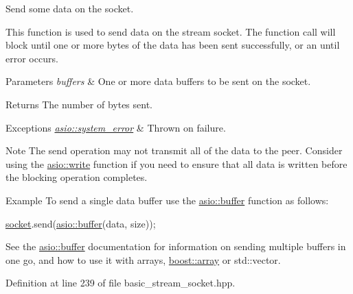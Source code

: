 Send some data on the socket. 

This function is used to send data on the stream socket. The function call will block until one or more bytes of the data has been sent successfully, or an until error occurs.


\begin{DoxyParams}{Parameters}
{\em buffers} & One or more data buffers to be sent on the socket.\\
\hline
\end{DoxyParams}
\begin{DoxyReturn}{Returns}
The number of bytes sent.
\end{DoxyReturn}

\begin{DoxyExceptions}{Exceptions}
{\em \hyperlink{classasio_1_1system__error}{asio\+::system\+\_\+error}} & Thrown on failure.\\
\hline
\end{DoxyExceptions}
\begin{DoxyNote}{Note}
The send operation may not transmit all of the data to the peer. Consider using the \hyperlink{group__write}{asio\+::write} function if you need to ensure that all data is written before the blocking operation completes.
\end{DoxyNote}
\begin{DoxyParagraph}{Example}
To send a single data buffer use the \hyperlink{group__buffer}{asio\+::buffer} function as follows\+: 
\begin{DoxyCode}
\hyperlink{namespacewebsocketpp_1_1transport_1_1asio_1_1socket_1_1error_a828ddaa5ed63a761e1b557465a35f05aa0c31b356014843e1d09514e794a539a7}{socket}.send(\hyperlink{group__buffer_ga1ed66e401559cbfd19595392f653b47c}{asio::buffer}(data, size));
\end{DoxyCode}
 See the \hyperlink{group__buffer}{asio\+::buffer} documentation for information on sending multiple buffers in one go, and how to use it with arrays, \hyperlink{classboost_1_1array}{boost\+::array} or std\+::vector. 
\end{DoxyParagraph}


Definition at line 239 of file basic\+\_\+stream\+\_\+socket.\+hpp.

\hypertarget{classasio_1_1basic__stream__socket_afe228e06332e5ed761f87045e77b5e41}{}
